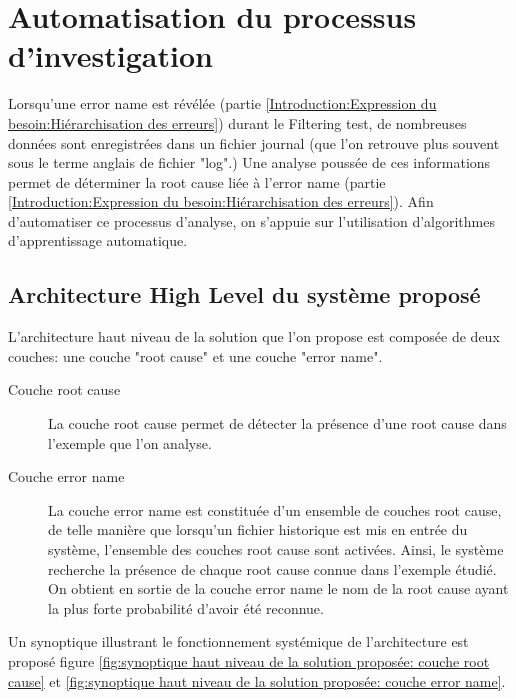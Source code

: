 \chapter{Automatisation du processus d'investigation}
\label{Automatisation du processus d'investigation}
\thispagestyle{fancy}
Lorsqu'une error name est révélée (partie \ref{Introduction:Expression du besoin:Hiérarchisation des erreurs}) durant le Filtering test, de nombreuses données sont enregistrées dans un fichier journal (que l'on retrouve plus souvent sous le terme anglais de fichier "log".) Une analyse poussée de ces informations permet de déterminer la root cause liée à l'error name (partie \ref{Introduction:Expression du besoin:Hiérarchisation des erreurs}). Afin d'automatiser ce processus d'analyse, on s'appuie sur l'utilisation d'algorithmes d'apprentissage automatique. 

\section{Architecture High Level du système proposé}
\label{Automatisation du processus d'investigation: Achitecture High Level du système proposé}
L'architecture haut niveau de la solution que l'on propose est composée de deux couches: une couche "root cause" et une couche "error name".
\begin{description}
	\item [Couche root cause] La couche root cause permet de détecter la présence d'une root cause dans l'exemple que l'on analyse.
	\item [Couche error name] La couche error name est constituée d'un ensemble de couches root cause, de telle manière que lorsqu'un fichier historique est mis en entrée du système, l'ensemble des couches root cause sont activées. Ainsi, le système recherche la présence de chaque root cause connue dans l'exemple étudié. On obtient en sortie de la couche error name le nom de la root cause ayant la plus forte probabilité d'avoir été reconnue.
\end{description} 

Un synoptique illustrant le fonctionnement systémique de l'architecture est proposé figure \ref{fig:synoptique haut niveau de la solution proposée: couche root cause} et \ref{fig:synoptique haut niveau de la solution proposée: couche error name}.

